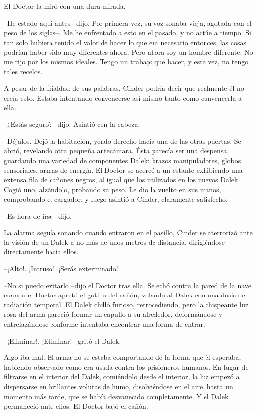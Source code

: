 El Doctor la miró con una dura mirada. 

--He estado aquí antes --dijo. Por primera vez, su voz sonaba vieja, agotada con el peso de los siglos--. Me he enfrentado a esto en el pasado, y no actúe a tiempo. Si tan solo hubiera tenido el valor de hacer lo que era necesario entonces, las cosas podrían haber sido muy diferentes ahora. Pero ahora soy un hombre diferente. No me rijo por los mismos ideales. Tengo un trabajo que hacer, y esta vez, no tengo tales recelos.

A pesar de la frialdad de sus palabras, Cinder podría decir que realmente él no creía esto. Estaba intentando convencerse así mismo tanto como convencerla a ella.

--¿Estás seguro? --dijo. 
Asintió con la cabeza. 

--Déjalos. Dejó la habitación, yendo derecho hacia una de las otras puertas. Se abrió, revelando otra pequeña antecámara. Ésta parecía ser una despensa, guardando una variedad de componentes Dalek: brazos manipuladores, globos sensoriales, armas de energía. El Doctor se acercó a un estante exhibiendo una extensa fila de cañones negros, al igual que los utilizados en los nuevos Dalek.
Cogió uno, alzándolo, probando su peso. Le dio la vuelto en sus manos, comprobando el cargador, y luego asintió a Cinder, claramente satisfecho. 

--Es hora de irse --dijo.

La alarma seguía sonando cuando entraron en el pasillo, Cinder se aterrorizó ante la visión de un Dalek a no más de unos metros de distancia, dirigiéndose directamente hacia ellos.

--¡Alto!. ¡Intruso!. ¡Serás exterminado!.

--No si puedo evitarlo --dijo el Doctor tras ella. Se echó contra la pared de la nave cuando el Doctor apretó el gatillo del cañón, volando al Dalek con una dosis de radiación temporal. El Dalek chilló furioso, retrocediendo, pero la chispeante luz rosa del arma pareció formar un capullo a su alrededor, deformándose y entrelazándose conforme intentaba encontrar una forma de entrar.

--¡Eliminar!. ¡Eliminar! --gritó el Dalek. 

Algo iba mal. El arma no se estaba comportando de la forma que él esperaba, habiendo observado como era usada contra los prisioneros humanos. En lugar de filtrarse en el interior del Dalek, comiéndolo desde el interior, la luz empezó a dispersarse en brillantes volutas de humo, disolviéndose en el aire, hasta un momento más tarde, que se había desvanecido completamente. Y el Dalek permaneció ante ellos. El Doctor bajó el cañón. 

